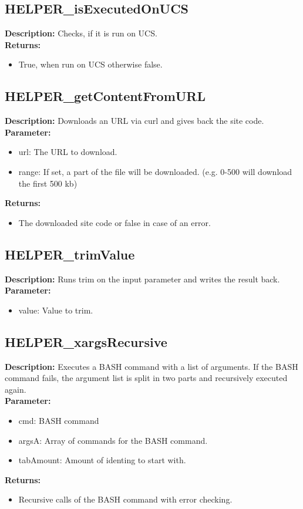 \subsection{HELPER\_isExecutedOnUCS}
\textbf{Description:} Checks, if it is run on UCS.\\
\textbf{Returns:}
\begin{itemize}
\item True, when run on UCS otherwise false.
\end{itemize}

\subsection{HELPER\_getContentFromURL}
\textbf{Description:} Downloads an URL via curl and gives back the site code.\\
\textbf{Parameter:}
\begin{itemize}
\item url: The URL to download.
\item range: If set, a part of the file will be downloaded. (e.g. 0-500 will download the first 500 kb)
\end{itemize}
\textbf{Returns:}
\begin{itemize}
\item The downloaded site code or false in case of an error.
\end{itemize}

\subsection{HELPER\_trimValue}
\textbf{Description:} Runs trim on the input parameter and writes the result back.\\
\textbf{Parameter:}
\begin{itemize}
\item value: Value to trim.
\end{itemize}

\subsection{HELPER\_xargsRecursive}
\textbf{Description:} Executes a BASH command with a list of arguments. If the BASH command fails, the argument list is split in two parts and recursively executed again.\\
\textbf{Parameter:}
\begin{itemize}
\item cmd: BASH command
\item argsA: Array of commands for the BASH command.
\item tabAmount: Amount of identing to start with.
\end{itemize}
\textbf{Returns:}
\begin{itemize}
\item Recursive calls of the BASH command with error checking.
\end{itemize}

